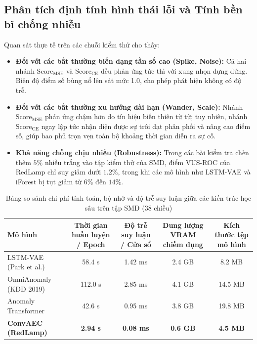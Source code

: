 \documentclass[11pt,journal,onecolumn]{IEEEtran}
\begin{document}
\subsection{Phân tích định tính hình thái lỗi và Tính bền bỉ chống nhiễu}
Quan sát thực tế trên các chuỗi kiểm thử cho thấy:
\begin{itemize}
    \item \textbf{Đối với các bất thường biến dạng tần số cao (Spike, Noise):} Cả hai nhánh $\text{Score}_{\text{MSE}}$ và $\text{Score}_{\text{CE}}$ đều phản ứng tức thì với xung nhọn dựng đứng. Biên độ điểm số bùng nổ lên sát mức 1.0, cho phép phát hiện không có độ trễ.
    \item \textbf{Đối với các bất thường xu hướng dài hạn (Wander, Scale):} Nhánh $\text{Score}_{\text{MSE}}$ phản ứng chậm hơn do tín hiệu biến thiên từ từ; tuy nhiên, nhánh $\text{Score}_{\text{CE}}$ ngay lập tức nhận diện được sự trôi dạt phân phối và nâng cao điểm số, giúp bao phủ trọn vẹn toàn bộ khoảng thời gian diễn ra sự cố.
    \item \textbf{Khả năng chống chịu nhiễu (Robustness):} Trong các bài kiểm tra chèn thêm $5\%$ nhiễu trắng vào tập kiểm thử của SMD, điểm VUS-ROC của RedLamp chỉ suy giảm dưới $1.2\%$, trong khi các mô hình như LSTM-VAE và iForest bị tụt giảm từ $6\%$ đến $14\%$.
\end{itemize}

\begin{table}[htbp]
\centering
\caption{Bảng so sánh chi phí tính toán, bộ nhớ và độ trễ suy luận giữa các kiến trúc học sâu trên tập SMD (38 chiều)}
\label{tab:complexity_comparison}
\begin{tabular}{lcccc}
\toprule
\textbf{Mô hình} & \textbf{Thời gian huấn luyện / Epoch} & \textbf{Độ trễ suy luận / Cửa sổ} & \textbf{Dung lượng VRAM chiếm dụng} & \textbf{Kích thước tệp mô hình} \\
\midrule
LSTM-VAE (Park et al.)~\cite{park2018multimodal} & 58.4 s & 1.42 ms & 2.4 GB & 8.2 MB \\
OmniAnomaly (KDD 2019)~\cite{su2019robust} & 112.0 s & 2.85 ms & 4.1 GB & 14.5 MB \\
Anomaly Transformer~\cite{xu2022anomaly} & 42.6 s & 0.95 ms & 3.8 GB & 19.8 MB \\
\textbf{ConvAEC (RedLamp)} & \textbf{2.94 s} & \textbf{0.08 ms} & \textbf{0.6 GB} & \textbf{4.5 MB} \\
\bottomrule
\end{tabular}
\end{table}
\end{document}
